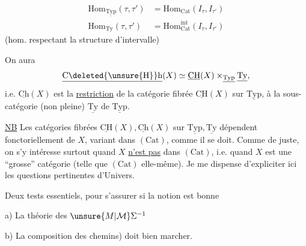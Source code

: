 
\[
\begin{aligned}
\mathrm{Hom}_{\underline{\mathrm{Typ}}}(\tau,\tau')&=\mathrm{Hom}_{\mathrm{Cat}}(I_\tau,I_{\tau'})\\
\mathrm{Hom}_{\mathrm{Ty}}(\tau,\tau')&=\mathrm{Hom}^{\mathrm{int}}_{\mathrm{Cat}}(I_\tau,I_{\tau'})
\end{aligned}
\]
(hom. respectant la structure d'intervalle)

On aura
\[
\underline{\mathrm{C}\deleted{\unsure{\mathrm{H}}}\mathrm{h}}(X)\simeq \underline{\mathrm{CH}}(X)\mathbin{\times}_{\underline{\mathrm{Typ}}}\underline{\mathrm{Ty}},
\]
i.e. $\underline{\mathrm{Ch}}(X)$ est la \uline{restriction} de la catégorie fibrée $\underline{\mathrm{CH}}(X)$ sur $\underline{\mathrm{Typ}}$, à la sous-catégorie (non pleine) $\underline{\mathrm{Ty}}$ de $\underline{\mathrm{Typ}}$.

\uline{NB} Les catégories fibrées $\underline{\mathrm{CH}}(X),\underline{\mathrm{Ch}}(X)$ sur $\underline{\mathrm{Typ}},\underline{\mathrm{Ty}}$ dépendent fonctoriellement de $X$, variant dans $(\mathrm{Cat})$, comme il se doit. Comme de juste, on s'y intéresse surtout quand $X$ \uline{n'est pas} dans $(\mathrm{Cat})$, i.e. quand $X$ est une ``grosse'' catégorie (telle que $(\mathrm{Cat})$ elle-même). Je me dispense d'expliciter ici les questions pertinentes d'Univers.

Deux tests essentiels, pour s'assurer si la notion est bonne

a) La théorie des $\unsure{M|\mathcal M}\Sigma^{-1}$

b) La composition des chemins) doit bien marcher.
